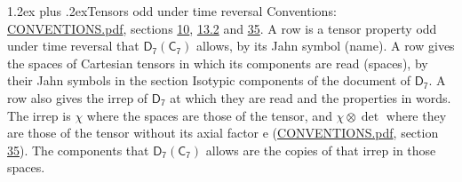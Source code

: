 \documentclass[10pt,a4paper]{article}
\makeatletter
\renewcommand\section{\@startsection{section}{1}{\z@}{-3ex plus -1ex minus -.2ex}%
  {1.2ex plus .2ex}{\normalfont\large\sffamily\bfseries\color{parttitle}}}
\numberwithin{equation}{section}
\newcommand{\grp}[1]{\mathsf{#1}}
\newcommand{\irrprod}{\otimes}
\makeatother
\begin{document}
\section{Tensors odd under time reversal}\label{s:time_odd}
Conventions: \href{../../CONVENTIONS.pdf}{CONVENTIONS.pdf}, sections \href{../../../rotation/CONVENTIONS.pdf\#conv.10}{10}, \href{../../../rotation/CONVENTIONS.pdf\#conv.13.2}{13.2} and \href{../../CONVENTIONS.pdf\#conv.35}{35}.
\leavevmode\label{n:head.name.property}A row is a tensor property odd under time reversal that $\grp{D_{7}}(\grp{C_{7}})$ allows, by its Jahn symbol (name). \label{n:head.spaces}A row gives the spaces of Cartesian tensors in which its components are read (spaces), by their Jahn symbols in the section Isotypic components of the document of \href{../../../rotation/data/pdf/D7.pdf}{$\grp{D_{7}}$}. \label{n:head.properties}A row also gives the irrep of $\grp{D_{7}}$ at which they are read and the properties in words. The irrep is $\chi$ where the spaces are those of the tensor, and $\chi \irrprod \det$ where they are those of the tensor without its axial factor e (\href{../../CONVENTIONS.pdf}{CONVENTIONS.pdf}, section \href{../../CONVENTIONS.pdf\#conv.35}{35}). The components that $\grp{D_{7}}(\grp{C_{7}})$ allows are the copies of that irrep in those spaces.
\end{document}
